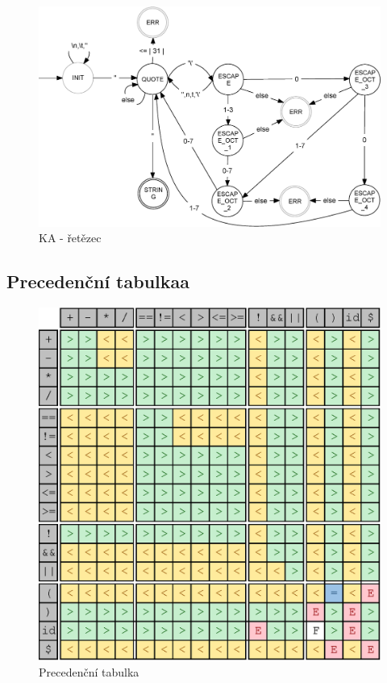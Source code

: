 \documentclass[a4paper,11pt]{article}
\begin{document}
\begin{figure}[H]
	\centering
	\includegraphics[scale=.31]{FSM_STRING.eps}
	\caption{KA - řetězec}
\end{figure}

\subsection{Precedenční tabulkaa}
\begin{figure}[H]
   \centering
   \includegraphics[]{precedence_tab.eps}
   \caption{Precedenční tabulka}
\end{figure}
\end{document}

